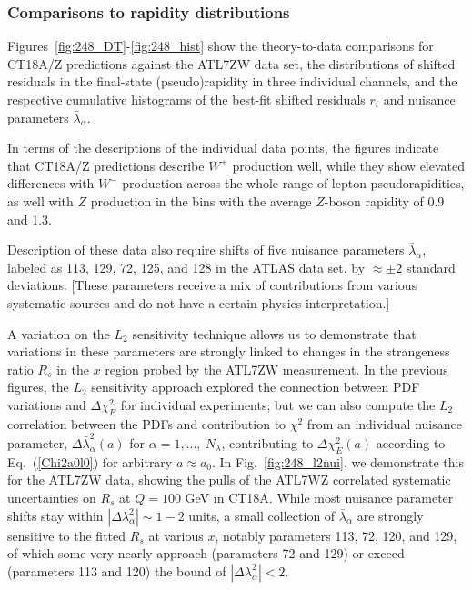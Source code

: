 \subsubsection{Comparisons to rapidity distributions}
\label{sec:ATL7ZWrap}

Figures~\ref{fig:248_DT}-\ref{fig:248_hist} show the theory-to-data
comparisons for CT18A/Z predictions against the ATL7ZW data set, the
distributions of shifted residuals in the final-state (pseudo)rapidity in
three individual channels, and the respective
cumulative histograms of the best-fit shifted
residuals $r_i$ and nuisance parameters $\bar\lambda_\alpha$.

In terms of the descriptions of the individual data points, the
figures indicate that CT18A/Z predictions describe $W^+$ production
well, while they show elevated differences with $W^-$ production
across the whole range of lepton pseudorapidities, as well with $Z$
production in the bins with the average $Z$-boson rapidity of 0.9 and 1.3.

Description of these data also require shifts of five nuisance
parameters $\bar \lambda_\alpha$,
labeled as 113, 129, 72, 125, and 128 in the ATLAS
data set, by $\approx \pm 2$ standard deviations. [These parameters
receive a mix of contributions from various systematic sources and
do not have a certain physics interpretation.]

A variation on the $L_2$ sensitivity technique allows us to demonstrate that
variations in these parameters are strongly linked to changes in the
strangeness ratio $R_s$ in the $x$ region probed by the ATL7ZW
measurement.
In the previous figures, the $L_2$ sensitivity approach explored the
connection between PDF variations and $\Delta \chi^2_E$
for individual experiments; but we can also compute
the $L_2$ correlation between the PDFs and contribution to $\chi^2$ from an individual nuisance parameter,  
$\Delta \bar \lambda^2_\alpha(a)$ 
for $\alpha=1,...,\ N_\lambda$, contributing to $\Delta \chi^2_E(a)$ according to Eq.~(\ref{Chi2a0l0}) for arbitrary $a\approx a_0$. In Fig.~\ref{fig:248_l2nui}, we demonstrate this for the ATL7ZW data, showing the
pulls of the ATL7WZ correlated systematic uncertainties on $R_s$ at $Q=100$ GeV in CT18A. While most nuisance parameter shifts
stay within $|\Delta \lambda^2_\alpha|\! \sim\! 1\!-\!2$ units, a
small collection of $\bar \lambda_\alpha$
are strongly sensitive to the fitted $R_s$ at various $x$,
notably parameters 113, 72, 120, and 129,
of which
some very nearly approach (parameters 72 and 129) or exceed (parameters 113 and 120)
the bound of $|\Delta \lambda^2_\alpha|\! <\!2$.


